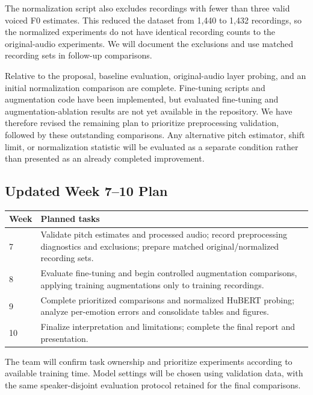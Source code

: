 \documentclass[11pt, letterpaper]{article}
\begin{document}
The normalization script also excludes recordings with fewer than three valid voiced F0 estimates. This reduced the dataset from 1,440 to 1,432 recordings, so the normalized experiments do not have identical recording counts to the original-audio experiments. We will document the exclusions and use matched recording sets in follow-up comparisons.

Relative to the proposal, baseline evaluation, original-audio layer probing, and an initial normalization comparison are complete. Fine-tuning scripts and augmentation code have been implemented, but evaluated fine-tuning and augmentation-ablation results are not yet available in the repository. We have therefore revised the remaining plan to prioritize preprocessing validation, followed by these outstanding comparisons. Any alternative pitch estimator, shift limit, or normalization statistic will be evaluated as a separate condition rather than presented as an already completed improvement.

\subsection{Updated Week 7--10 Plan}

\begin{center}
\begin{tabular}{lp{11.5cm}}
\toprule
\textbf{Week} & \textbf{Planned tasks} \\
\midrule
7 & Validate pitch estimates and processed audio; record preprocessing diagnostics and exclusions; prepare matched original/normalized recording sets. \\
8 & Evaluate fine-tuning and begin controlled augmentation comparisons, applying training augmentations only to training recordings. \\
9 & Complete prioritized comparisons and normalized HuBERT probing; analyze per-emotion errors and consolidate tables and figures. \\
10 & Finalize interpretation and limitations; complete the final report and presentation. \\
\bottomrule
\end{tabular}
\end{center}

The team will confirm task ownership and prioritize experiments according to available training time. Model settings will be chosen using validation data, with the same speaker-disjoint evaluation protocol retained for the final comparisons.
\end{document}
